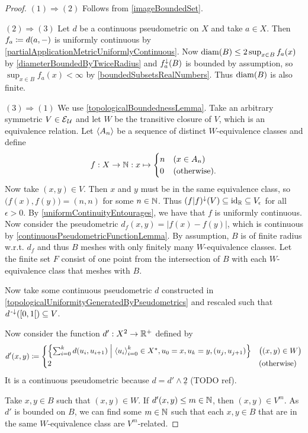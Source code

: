 \begin{proof}
$(1) \Rightarrow (2)$ Follows from \ref{imageBoundedSet}.

$(2) \Rightarrow (3)$ Let $d$ be a continuous pseudometric on $X$ and take $a\in X$. Then $f_a \coloneqq d(a,-)$ is uniformly continuous by \ref{partialApplicationMetricUniformlyContinuous}. Now $\operatorname{diam}(B)\leq 2\sup_{x\in B}f_a(x)$ by \ref{diameterBoundedByTwiceRadius} and $f_a^\downarrow(B)$ is bounded by assumption, so $\sup_{x\in B}f_a(x) < \infty $ by \ref{boundedSubsetsRealNumbers}. Thus $\operatorname{diam}(B)$ is also finite.

$(3) \Rightarrow (1)$ We use \ref{topologicalBoundednessLemma}. Take an arbitrary symmetric $V\in \operatorname{\mathcal{E}}_\mathcal{U}$ and let $W$ be the transitive closure of $V$, which is an equivalence relation. Let $\left\langle A_n \right\rangle$ be a sequence of distinct $W$-equivalence classes and define
\[ f: X\to \mathbb{N}: x\mapsto \begin{cases}
n & (x\in A_n) \\
0 & (\text{otherwise}).
\end{cases} \]
Now take $(x,y)\in V$. Then $x$ and $y$ must be in the same equivalence class, so $\big(f(x), f(y)\big) = (n,n)$ for some $n\in\mathbb{N}$. Thus $(f|f)^\downarrow(V)\subseteq \operatorname{id}_{\mathbb{R}} \subseteq V_\epsilon$ for all $\epsilon>0$. By \ref{uniformContinuityEntourages}, we have that $f$ is uniformly continuous. Now consider the pseudometric $d_f(x,y) = |f(x)-f(y)|$, which is continuous by \ref{continuousPseudometricFunctionLemma}. By assumption, $B$ is of finite radius w.r.t. $d_f$ and thus $B$ meshes with only finitely many $W$-equivalence classes. Let the finite set $F$ consist of one point from the intersection of $B$ with each $W$-equivalence class that meshes with $B$.

Now take some continuous pseudometric $d$ constructed in \ref{topologicalUniformityGeneratedByPseudometrics} and rescaled such that $d^\preimf(\interval[co]{0,1}) \subseteq V$.

Now consider the function $d': X^2\to \mathbb{R}^+$ defined by
\[ d'(x,y) \defeq \begin{cases}
\setbuilder{\sum_{i=0}^kd(u_i, u_{i+1})}{\seq{u_i}_{i=0}^k\in X^*, u_0 = x, u_k = y, (u_{j},u_{j+1})} & \big((x,y)\in W\big) \\
2 & (\text{otherwise})
\end{cases} \]
It is a continuous pseudometric because $d = d'\wedge \underline{2}$ (TODO ref).

Take $x,y\in B$ such that $(x,y)\in W$. If $d'(x,y)\leq m\in\mathbb{N}$, then $(x,y)\in V^m$. As $d'$ is bounded on $B$, we can find some $m\in \mathbb{N}$ such that each $x,y\in B$ that are in the same $W$-equivalence class are $V^m$-related.
\end{proof}

